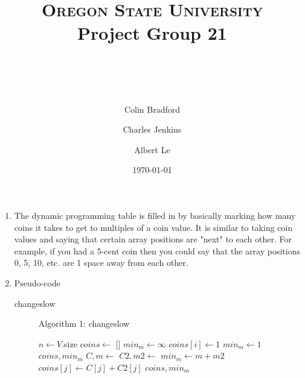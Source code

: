 \documentclass[paper=a4, fontsize=11pt]{scrartcl} %
\title{ 
    \normalfont \normalsize 
    \textsc{Oregon State University} \\ [25pt]
    \large Project Group 21
    \horrule{0.5pt} \\[0.4cm] %
    \huge \hwtitle \\ %
    \horrule{2pt} \\[0.5cm] %
}
\author{
    Colin Bradford
    \and
    Charles Jenkins
    \and
    Albert Le
} %
\date{\normalsize\today} %
\numberwithin{equation}{section} %
\numberwithin{figure}{section} %
\numberwithin{table}{section} %
\begin{document}
\maketitle %

\begin{enumerate}
    \item The dynamic programming table is filled in by basically marking how
    many coins it takes to get to multiples of a coin value. It is similar to
    taking coin values and saying that certain array positions are "next" to each
    other. For example, if you had a 5-cent coin then you could say that the array
    positions 0, 5, 10, etc. are 1 space away from each other.

    \item Pseudo-code
    \begin{description}
        \item[changeslow]
        \begin{algorithmc}
            \caption{Algorithm 1: changeslow}
                \State $n \gets V$.size
                \State $coins \gets$ []
                \State $min_m \gets \infty$
                        \State $coins[i] \gets 1$
                        \State $min_m \gets 1$
                        \Return $coins, min_m$
                    \EndIf
                \EndFor
                    \State $C, m \gets $ 
                    \State $C2, m2 \gets $ 
                        \State $min_m \gets m + m2$
                            \State $coins[j] \gets C[j] + C2[j]$
                        \EndFor
                    \EndIf
                \EndFor
                \State \Return $coins, min_m$
            \EndFunction
        \end{algorithmc}
    \end{description}
\end{enumerate}
\end{document}
